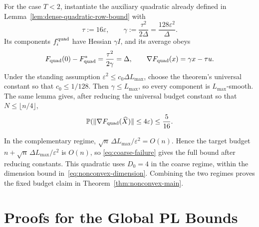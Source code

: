 \documentclass{article}
\theoremstyle{definition}
\newcommand{\Prob}{\mathbb{P}}
\begin{document}
For the case $T<2$, instantiate the auxiliary quadratic already defined
in Lemma~\ref{lem:dense-quadratic-row-bound} with
\begin{equation}
 \tau:=16\varepsilon,
 \qquad
 \gamma:=\frac{\tau^2}{2\Delta}
 =\frac{128\varepsilon^2}{\Delta}.
\end{equation}
Its components $f_i^{\rm quad}$ have Hessian $\gamma I$, and its average obeys
\begin{equation}
 F_{\rm quad}(0)-F_{\rm quad}^*
 =\frac{\tau^2}{2\gamma}=\Delta,
 \qquad
 \nabla F_{\rm quad}(x)=\gamma x-\tau u.
\end{equation}
Under the standing assumption
$\varepsilon^2\le c_0\Delta L_{\max}$, choose the theorem's universal
constant so that $c_0\le1/128$.  Then
$\gamma\le L_{\max}$, so every component is $L_{\max}$-smooth.  The same lemma
gives, after reducing the universal budget constant so that
$N\le\lfloor n/4\rfloor$,
\begin{equation}
 \Prob(\|\nabla F_{\rm quad}(\widehat X)\|\le4\varepsilon)
 \le\frac5{16}.
 \label{eq:coarse-failure}
\end{equation}

In the complementary regime,
$\sqrt n\,\Delta L_{\max}/\varepsilon^2=O(n)$.  Hence the target budget
$n+\sqrt n\,\Delta L_{\max}/\varepsilon^2$ is $O(n)$, so
\eqref{eq:coarse-failure} gives the full bound after reducing constants.
This quadratic uses $D_0=4$ in the
coarse regime, within the dimension bound
in~\eqref{eq:nonconvex-dimension}.  Combining the two regimes proves the
fixed budget claim in Theorem~\ref{thm:nonconvex-main}.

\section{Proofs for the Global PL Bounds}
\label{app:pl}
\end{document}
